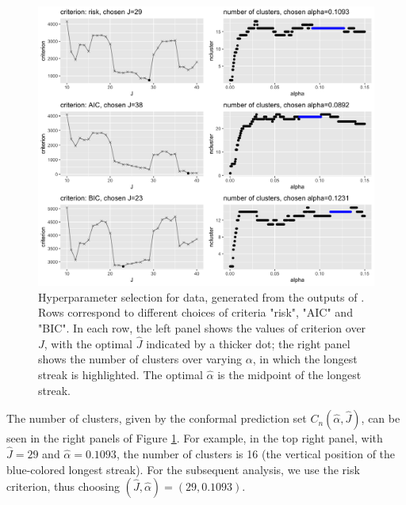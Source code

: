 \begin{figure}[t]
     \centering
     \includegraphics[scale = 0.147]{criterion.png}
     \caption{Hyperparameter selection for  data, generated from the outputs of . Rows correspond to different choices of criteria "risk", "AIC" and "BIC". In each row, the left panel shows the values of criterion over $J$, with the optimal $\hat{J}$ indicated by a thicker dot; the right panel shows the number of clusters over varying $\alpha$, in which the longest streak is highlighted. The optimal $\hat\alpha$ is the midpoint of the longest streak.}
     \label{fig:criterion}
\end{figure}

The number of clusters, given by the conformal prediction set $C_n(\hat\alpha,\hat{J})$, can be seen in the right panels of Figure \ref{fig:criterion}. For example, in the top right panel, with $\hat{J} = 29$ and $\hat\alpha = 0.1093$, the number of clusters is 16 (the vertical position of the blue-colored longest streak). 
For the subsequent analysis, we use the risk criterion, thus choosing $(\hat{J}, \hat\alpha) = (29, 0.1093)$.

